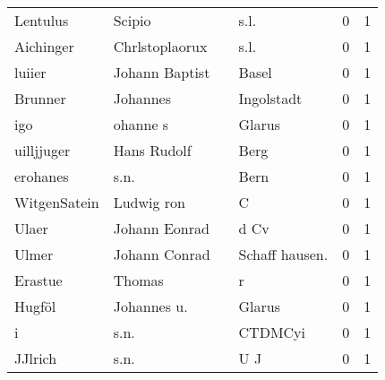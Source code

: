 \documentclass[10pt,a4paper,landscape]{article}
\begin{document}
\begin{longtable}{llllrr}
                 Lentulus &                             Scipio &             &                                        s.l. &          0 &         1 \\
                Aichinger &                     Chrlstoplaorux &             &                                        s.l. &          0 &         1 \\
                   luiier &                     Johann Baptist &             &                                       Basel &          0 &         1 \\
                  Brunner &                           Johannes &             &                                  Ingolstadt &          0 &         1 \\
                      igo &                           ohanne s &             &                                      Glarus &          0 &         1 \\
               uilljjuger &                        Hans Rudolf &             &                                        Berg &          0 &         1 \\
                 erohanes &                               s.n. &             &                                        Bern &          0 &         1 \\
             WitgenSatein &                         Ludwig ron &             &                                           C &          0 &         1 \\
                    Ulaer &                      Johann Eonrad &             &                                        d Cv &          0 &         1 \\
                    Ulmer &                      Johann Conrad &             &                             Schaff hausen.  &          0 &         1 \\
                  Erastue &                             Thomas &             &                                           r &          0 &         1 \\
                   Hugföl &                        Johannes u. &             &                                      Glarus &          0 &         1 \\
                        i &                               s.n. &             &                                     CTDMCyi &          0 &         1 \\
                  JJlrich &                               s.n. &             &                                         U J &          0 &         1 \\

\end{longtable}
\end{document}
